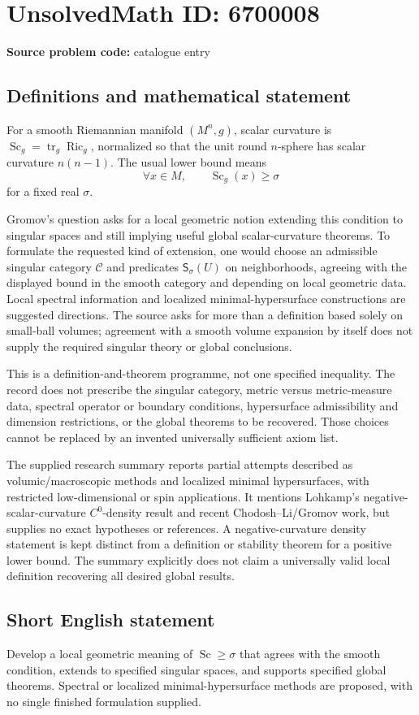 \documentclass[11pt]{article}
\begin{document}
\section*{UnsolvedMath ID: 6700008}
\textbf{Source problem code:} catalogue entry
\subsection{Definitions and mathematical statement}
For a smooth Riemannian manifold \((M^n,g)\), scalar curvature is \(\operatorname{Sc}_g=\operatorname{tr}_g\operatorname{Ric}_g\), normalized so that the unit round \(n\)-sphere has scalar curvature \(n(n-1)\). The usual lower bound means
\[
\forall x\in M,\qquad \operatorname{Sc}_g(x)\ge\sigma
\]
for a fixed real \(\sigma\).

Gromov's question asks for a local geometric notion extending this condition to singular spaces and still implying useful global scalar-curvature theorems. To formulate the requested kind of extension, one would choose an admissible singular category \(\mathcal C\) and predicates \(\mathsf S_\sigma(U)\) on neighborhoods, agreeing with the displayed bound in the smooth category and depending on local geometric data. Local spectral information and localized minimal-hypersurface constructions are suggested directions. The source asks for more than a definition based solely on small-ball volumes; agreement with a smooth volume expansion by itself does not supply the required singular theory or global conclusions.

This is a definition-and-theorem programme, not one specified inequality. The record does not prescribe the singular category, metric versus metric-measure data, spectral operator or boundary conditions, hypersurface admissibility and dimension restrictions, or the global theorems to be recovered. Those choices cannot be replaced by an invented universally sufficient axiom list.

The supplied research summary reports partial attempts described as volumic/macroscopic methods and localized minimal hypersurfaces, with restricted low-dimensional or spin applications. It mentions Lohkamp's negative-scalar-curvature \(C^0\)-density result and recent Chodosh--Li/Gromov work, but supplies no exact hypotheses or references. A negative-curvature density statement is kept distinct from a definition or stability theorem for a positive lower bound. The summary explicitly does not claim a universally valid local definition recovering all desired global results.
\subsection{Short English statement}
Develop a local geometric meaning of \(\operatorname{Sc}\ge\sigma\) that agrees with the smooth condition, extends to specified singular spaces, and supports specified global theorems. Spectral or localized minimal-hypersurface methods are proposed, with no single finished formulation supplied.
\end{document}
